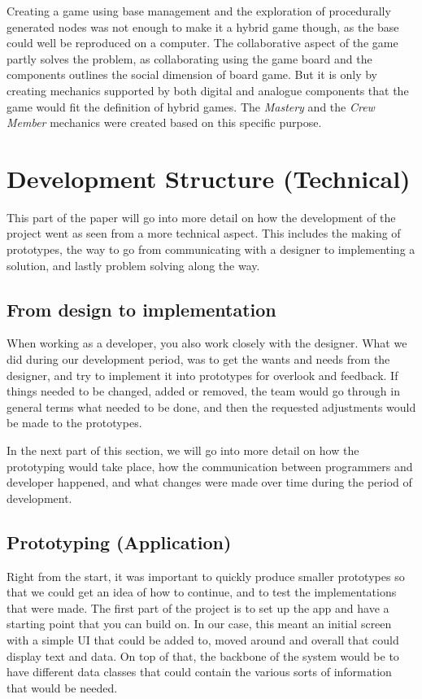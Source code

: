 Creating a game using base management and the exploration of procedurally generated nodes was not enough to make it a hybrid game though, as the base could well be reproduced on a computer. The collaborative aspect of the game partly solves the problem, as collaborating using the game board and the components outlines the social dimension of board game. But it is only by creating mechanics supported by both digital and analogue components that the game would fit the definition of hybrid games. The \textit{Mastery} and the \textit{Crew Member} mechanics were created based on this specific purpose.



\section{Development Structure (Technical)}
This part of the paper will go into more detail on how the development of the project went as seen from a more technical aspect. This includes the making of prototypes, the way to go from communicating with a designer to implementing a solution, and lastly problem solving along the way.

\subsection{From design to implementation}
When working as a developer, you also work closely with the designer. What we did during our development period, was to get the wants and needs from the designer, and try to implement it into prototypes for overlook and feedback. 
If things needed to be changed, added or removed, the team would go through in general terms what needed to be done, and then the requested adjustments would be made to the prototypes.

In the next part of this section, we will go into more detail on how the prototyping would take place, how the communication between programmers and developer happened, and what changes were made over time during the period of development.

\subsection{Prototyping (Application)}
Right from the start, it was important to quickly produce smaller prototypes so that we could get an idea of how to continue, and to test the implementations that were made. The first part of the project is to set up the app and have a starting point that you can build on. In our case, this meant an initial screen with a simple UI that could be added to, moved around and overall that could display text and data. On top of that, the backbone of the system would be to have different data classes that could contain the various sorts of information that would be needed.

